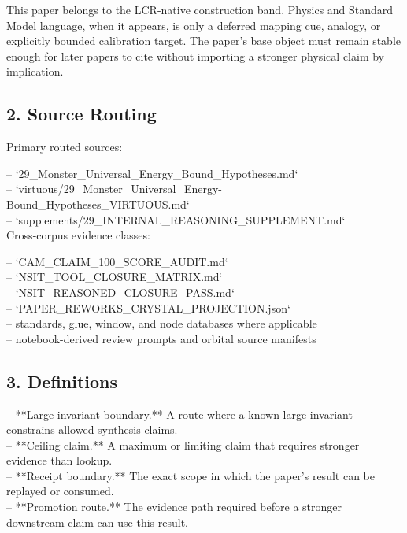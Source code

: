 \documentclass[11pt]{article}
\begin{document}
This paper belongs to the LCR-native construction band. Physics and Standard Model language, when it appears, is only a deferred mapping cue, analogy, or explicitly bounded calibration target. The paper's base object must remain stable enough for later papers to cite without importing a stronger physical claim by implication.

\subsection*{2. Source Routing}

Primary routed sources:

\noindent{}-- `29\_Monster\_Universal\_Energy\_Bound\_Hypotheses.md`\\
\noindent{}-- `virtuous/29\_Monster\_Universal\_Energy-Bound\_Hypotheses\_VIRTUOUS.md`\\
\noindent{}-- `supplements/29\_INTERNAL\_REASONING\_SUPPLEMENT.md`\\

Cross-corpus evidence classes:

\noindent{}-- `CAM\_CLAIM\_100\_SCORE\_AUDIT.md`\\
\noindent{}-- `NSIT\_TOOL\_CLOSURE\_MATRIX.md`\\
\noindent{}-- `NSIT\_REASONED\_CLOSURE\_PASS.md`\\
\noindent{}-- `PAPER\_REWORKS\_CRYSTAL\_PROJECTION.json`\\
\noindent{}-- standards, glue, window, and node databases where applicable\\
\noindent{}-- notebook-derived review prompts and orbital source manifests\\

\subsection*{3. Definitions}

\noindent{}-- **Large-invariant boundary.** A route where a known large invariant constrains allowed synthesis claims.\\
\noindent{}-- **Ceiling claim.** A maximum or limiting claim that requires stronger evidence than lookup.\\
\noindent{}-- **Receipt boundary.** The exact scope in which the paper's result can be replayed or consumed.\\
\noindent{}-- **Promotion route.** The evidence path required before a stronger downstream claim can use this result.\\
\end{document}

